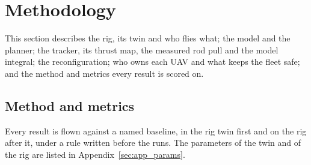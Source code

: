 \section{Methodology}
\label{sec:method}


This section describes the rig, its twin and who flies what; the model and the planner; the tracker, its thrust map,
the measured rod pull and the model integral; the reconfiguration; who owns each UAV and what keeps the fleet safe;
and the method and metrics every result is scored on.













\subsection{Method and metrics}
\label{sec:experiments}

Every result is flown against a named baseline, in the rig twin first and on the rig after it, under a rule
written before the runs. The parameters of the twin and of the rig are listed in Appendix~\ref{sec:app_params}.






